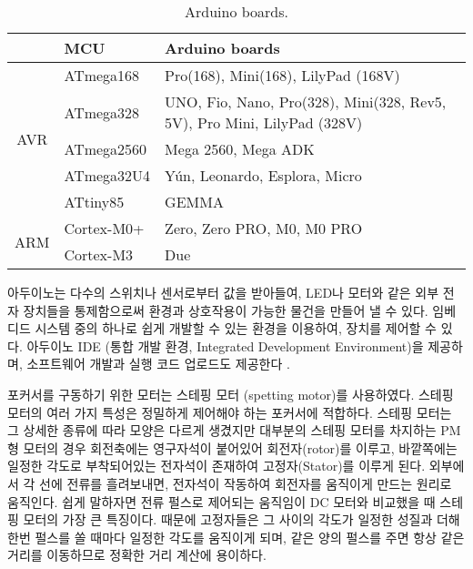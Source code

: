 \begin{table}[ht]
	\caption{Arduino boards. \cite{wiki-arduino}}
	\begin{tabular}{c|l|l}
	\toprule[1pt]
		& MCU        & Arduino boards                            \\ 
		\toprule[1pt]
	
		\multirow{5}{*}{AVR} & ATmega168  & Pro(168), Mini(168), LilyPad (168V)                                     \\
		& ATmega328  & UNO, Fio, Nano, Pro(328), Mini(328, Rev5, 5V), Pro Mini, LilyPad (328V) \\
		& ATmega2560 & Mega 2560, Mega ADK                                                     \\
		& ATmega32U4 & Yún, Leonardo, Esplora, Micro                                           \\
		& ATtiny85   & GEMMA                                                                   \\ 
		\midrule[1pt]
		\multirow{2}{*}{ARM} & Cortex-M0+ & Zero, Zero PRO, M0, M0 PRO                                              \\
		& Cortex-M3  & Due      \\
	\bottomrule[1pt]   
	\end{tabular}
	\label{table:arduino_boards}
\end{table}

아두이노는 다수의 스위치나 센서로부터 값을 받아들여, LED나 모터와 같은 외부 전자 장치들을 통제함으로써 환경과 상호작용이 가능한 물건을 만들어 낼 수 있다. 임베디드 시스템 중의 하나로 쉽게 개발할 수 있는 환경을 이용하여, 장치를 제어할 수 있다. 아두이노 IDE (통합 개발 환경, Integrated Development Environment)을 제공하며, 소프트웨어 개발과 실행 코드 업로드도 제공한다 \cite{wiki-arduino}. 

포커서를 구동하기 위한 모터는 스테핑 모터 (spetting motor)를 사용하였다. 스테핑 모터의 여러 가지 특성은 정밀하게 제어해야 하는 포커서에 적합하다. 스테핑 모터는 그 상세한 종류에 따라 모양은 다르게 생겼지만 대부분의 스테핑 모터를 차지하는 PM형 모터의 경우 회전축에는 영구자석이 붙어있어 회전자(rotor)를 이루고, 바깥쪽에는 일정한 각도로 부착되어있는 전자석이 존재하여 고정자(Stator)를 이루게 된다. 외부에서 각 선에 전류를 흘려보내면, 전자석이 작동하여 회전자를 움직이게 만드는 원리로 움직인다. 쉽게 말하자면 전류 펄스로 제어되는 움직임이 DC 모터와 비교했을 때 스테핑 모터의 가장 큰 특징이다. 때문에 고정자들은 그 사이의 각도가 일정한 성질과 더해 한번 펄스를 쏠 때마다 일정한 각도를 움직이게 되며, 같은 양의 펄스를 주면 항상 같은 거리를 이동하므로 정확한 거리 계산에 용이하다.



